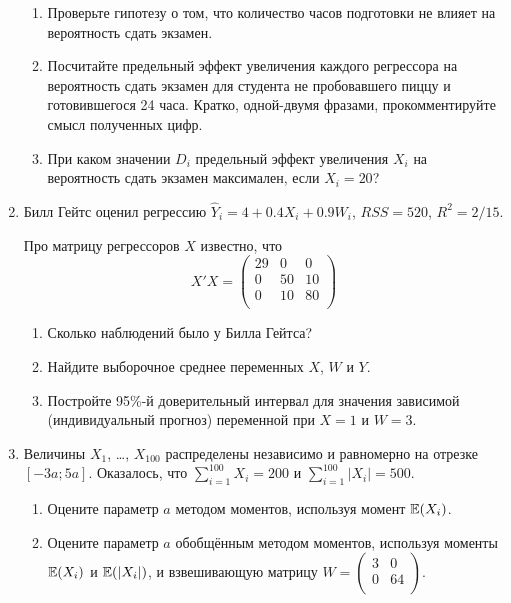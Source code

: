 \begin{enumerate}
\begin{enumerate}
  \item Проверьте гипотезу о том, что количество часов подготовки не влияет на вероятность сдать экзамен.
  \item Посчитайте предельный эффект увеличения каждого регрессора на вероятность сдать экзамен для студента не пробовавшего пиццу и готовившегося 24 часа.
Кратко, одной-двумя фразами, прокомментируйте смысл полученных цифр.
  \item При каком значении $D_i$ предельный эффект увеличения $X_i$ на вероятность сдать экзамен максимален,
  если $X_i=20$?
\end{enumerate}



\newpage
\item Билл Гейтс оценил регрессию $\hat Y_i = 4 + 0.4 X_i + 0.9 W_i$, $RSS = 520$, $R^2 = 2/15$.

Про матрицу регрессоров $X$ известно, что
\[
X'X = \begin{pmatrix}
	29 & 0 & 0 \\
	0 & 50 & 10 \\
	0 & 10 & 80 \\
\end{pmatrix}
\]

\begin{enumerate}
 \item Сколько наблюдений было у Билла Гейтса?
 \item Найдите выборочное среднее переменных $X$, $W$ и $Y$.
 \item Постройте 95\%-й доверительный интервал для значения зависимой (индивидуальный прогноз) переменной при $X=1$ и $W=3$.
\end{enumerate}

\item Величины $X_1$, \ldots, $X_{100}$ распределены независимо и равномерно на отрезке $[-3a;5a]$.
	Оказалось, что $\sum_{i=1}^{100} X_i = 200$ и $\sum_{i=1}^{100}|X_i| = 500$.

\begin{enumerate}
  \item Оцените параметр $a$ методом моментов, используя момент $\operatorname{\mathbb{E}}(X_i)$.
  \item Оцените параметр $a$ обобщённым методом моментов, используя моменты $\operatorname{\mathbb{E}}(X_i)$ и $\operatorname{\mathbb{E}}(|X_i|)$, и взвешивающую матрицу $W = \begin{pmatrix}
		  3 & 0 \\
		  0 & 64 \\
	  \end{pmatrix}$.
\end{enumerate}


\end{enumerate}
